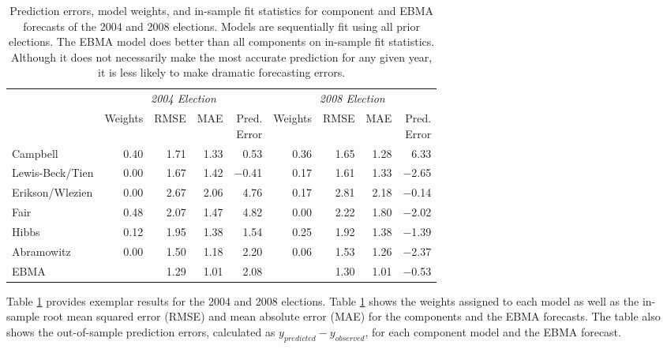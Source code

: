\documentclass[12pt,fullpage]{article}
\begin{document}
\begin{table}[ht!]
  \caption{\footnotesize Prediction errors, model weights, and in-sample fit
    statistics for component and EBMA forecasts of the 2004 and 2008
    elections.  Models are sequentially fit using all prior elections.
    The EBMA model does better than all components on in-sample fit
    statistics.  Although it does not necessarily make the most accurate
    prediction for any given year, it is less likely to make
    dramatic forecasting errors.}
\label{Pres-Year-Res} \small
\begin{center}
\begin{tabular}{l rrrrrrrr}	
  \toprule
   &\multicolumn{4}{c}{\textit{2004 Election}} &\multicolumn{4}{c}{\textit{2008 Election}} \\ 
 &	Weights&	RMSE &MAE &\shortstack{Pred. \\ Error}
 &Weights&	RMSE&	MAE &  \shortstack{Pred.\\  Error}\\
\midrule
 Campbell               &0.40&1.71&1.33 &0.53&0.36&1.65&1.28&6.33\\
  Lewis-Beck/Tien 	&0.00&1.67&1.42&$-$0.41&	0.17&1.61&1.33&$-$2.65\\
  Erikson/Wlezien 	&0.00&2.67&2.06&4.76&0.17&2.81&2.18&$-$0.14\\
  Fair                      	&0.48&2.07&1.47&4.82&0.00&2.22&1.80&$-$2.02 \\
  Hibbs                   	&0.12&1.95&1.38&1.54&0.25&1.92&1.38&$-$1.39\\
  Abramowitz        	&0.00&1.50&1.18&2.20&0.06&1.53&1.26&$-$2.37\\
  EBMA                    	&	       	&1.29&1.01&2.08&
  &1.30&1.01&$-$0.53\\
\bottomrule
\end{tabular}
 \end{center}
 \end{table}



Table \ref{Pres-Year-Res} provides exemplar results for the 2004 and 2008
elections.  Table \ref{Pres-Year-Res} shows the
weights assigned to each model as well as the in-sample root mean
squared error (RMSE) and mean absolute error (MAE) for the components
and the EBMA forecasts.   The table also shows the out-of-sample prediction
errors, calculated as $y_{predicted}-y_{observed}$, for each component
model and the EBMA forecast.

\end{document}
